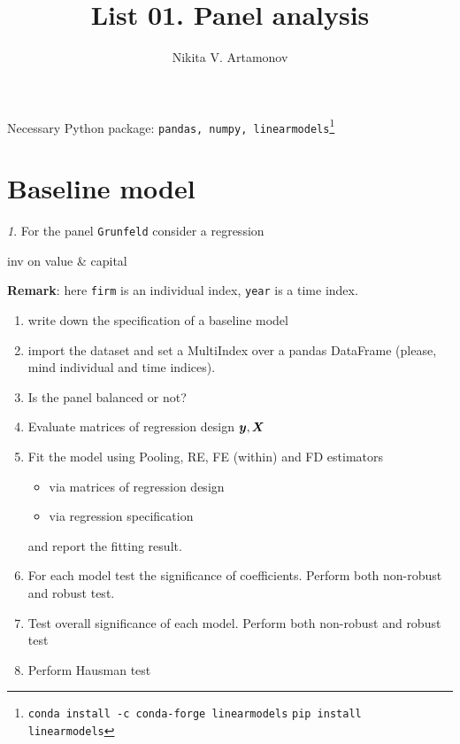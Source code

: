 \documentclass[12pt]{article}
\title{List 01. Panel analysis}
\author{Nikita V. Artamonov}
\theoremstyle{remark}
\newtheorem{exercise}{}[section]
\begin{document}
\maketitle

Necessary Python package: \texttt{pandas, numpy, linearmodels}\footnote{\texttt{conda install -c conda-forge linearmodels}
\texttt{pip install linearmodels}}

\tableofcontents

\section{Baseline model}

\begin{exercise}
For the panel \texttt{Grunfeld} consider a regression
\begin{center}
	inv on value \& capital
\end{center}
\textbf{Remark}: here \texttt{firm} is an individual index, 
\texttt{year} is a time index.
\begin{enumerate}
	\item write down the specification of a baseline model
	\item import the dataset and set a MultiIndex over a pandas DataFrame 
	(please, mind  individual and time indices).
	\item Is the panel balanced or not?
	\item Evaluate matrices of regression design \({\bm y}, {\bm X}\)
	\item Fit the model using Pooling, RE, FE (within) and FD estimators
	\begin{itemize}
		\item via matrices of regression design
		\item via regression specification
	\end{itemize}
	and report the fitting result.
	\item For each model test the significance of coefficients. Perform both
	non-robust and robust test.
	\item Test overall significance of each model. Perform both
	non-robust and robust test
	\item Perform Hausman test
\end{enumerate}
\end{exercise}
\end{document}
